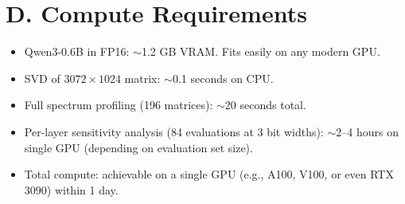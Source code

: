 \documentclass[11pt,a4paper]{article}
\begin{document}
\section*{D. Compute Requirements}

\begin{itemize}
    \item Qwen3-0.6B in FP16: $\sim$1.2 GB VRAM. Fits easily on any modern GPU.
    \item SVD of $3072 \times 1024$ matrix: $\sim$0.1 seconds on CPU.
    \item Full spectrum profiling (196 matrices): $\sim$20 seconds total.
    \item Per-layer sensitivity analysis (84 evaluations at 3 bit widths): $\sim$2--4 hours on single GPU (depending on evaluation set size).
    \item Total compute: achievable on a single GPU (e.g., A100, V100, or even RTX 3090) within 1 day.
\end{itemize}
\end{document}
